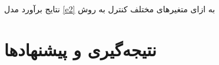 \documentclass[12pt, a4paper]{article}
\begin{document}
 
	\begin{table}[htbp]
	\centering
\caption{نتایج برآورد مدل \ref{e2}
	به ازای متغیر‌های مختلف کنترل به روش 
}
	\lr{	\resizebox{0.7\textheight}{!}{
			
			\label{tab:synchronicityt5}	
		}}
	\end{table}


\FloatBarrier

\section{نتیجه‌گیری و پیشنهاد‌ها}

\begin{LTR}		
	
	
\end{LTR}
\end{document}
